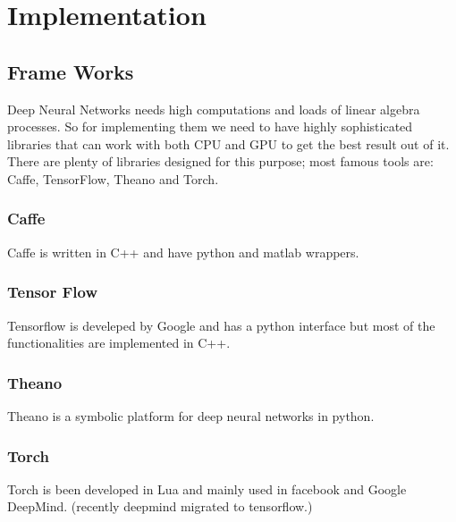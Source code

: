 \chapter{Implementation}\label{ch:impl}
\section{Frame Works}
Deep Neural Networks needs high computations and loads of linear algebra processes. So for implementing them we need to have highly sophisticated libraries that can work with both CPU and GPU to get the best result out of it. There are plenty of libraries designed for this purpose; most famous tools are: Caffe\cite{caffe}, TensorFlow\cite{tensorflow}, Theano\cite{theano} and Torch\cite{torch}.

\subsection{Caffe}
Caffe is written in C++ and have python and matlab wrappers.
\subsection{Tensor Flow}
Tensorflow is develeped by Google and has a python interface but most of the functionalities are implemented in C++.
\subsection{Theano}
Theano is a symbolic platform for deep neural networks in python.
\subsection{Torch}
Torch is been developed in Lua and mainly used in facebook and Google DeepMind. (recently deepmind migrated to tensorflow.)